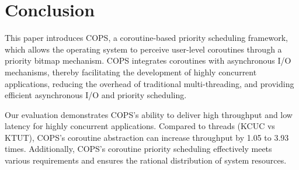 \documentclass[conference]{IEEEtran}
\begin{document}
\section{Conclusion}
\label{section: Conclusion}

This paper introduces COPS, a coroutine-based priority scheduling framework, which allows the operating system to perceive user-level coroutines through a priority bitmap mechanism. COPS integrates coroutines with asynchronous I/O mechanisms, thereby facilitating the development of highly concurrent applications, reducing the overhead of traditional multi-threading, and providing efficient asynchronous I/O and priority scheduling.

Our evaluation demonstrates COPS's ability to deliver high throughput and low latency for highly concurrent applications. Compared to threads (KCUC vs KTUT), COPS's coroutine abstraction can increase throughput by 1.05 to 3.93 times. Additionally, COPS's coroutine priority scheduling effectively meets various requirements and ensures the rational distribution of system resources.



\end{document}
